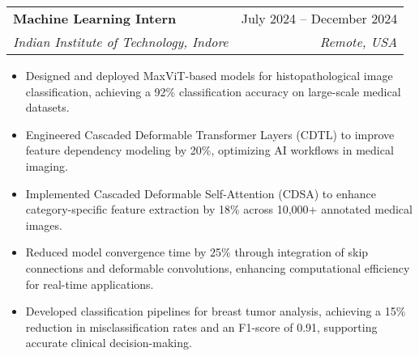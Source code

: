 \documentclass[letterpaper,10pt]{article}
\makeatletter
\newcommand{\resumeItem}[1]{
  \item\small{
    {#1 \vspace{-2pt}}
  }
}
\newcommand{\resumeSubheading}[4]{
  \vspace{-2pt}\item
    \begin{tabular*}{0.97\textwidth}[t]{l@{\extracolsep{\fill}}r}
      \textbf{#1} & #2 \\
      \textit{\small#3} & \textit{\small #4} \\
    \end{tabular*}\vspace{-7pt}
}
\newcommand{\resumeItemListStart}{\begin{itemize}}
\newcommand{\resumeItemListEnd}{\end{itemize}\vspace{-5pt}}
\makeatother
\begin{document}
\resumeSubheading
  {Machine Learning Intern \href{https://github.com/Akash-Kadali/A-Graph-Based-Framework-for-User-Level-Feature-Modeling-with-Contextual-Embeddings}{\faGithub}}{July 2024 -- December 2024}
  {Indian Institute of Technology, Indore}{Remote, USA}


      \resumeItemListStart
        \resumeItem{Designed and deployed MaxViT-based models for histopathological image classification, achieving a 92\% classification accuracy on large-scale medical datasets.}
        \resumeItem{Engineered Cascaded Deformable Transformer Layers (CDTL) to improve feature dependency modeling by 20\%, optimizing AI workflows in medical imaging.}
        \resumeItem{Implemented Cascaded Deformable Self-Attention (CDSA) to enhance category-specific feature extraction by 18\% across 10,000+ annotated medical images.}
        \resumeItem{Reduced model convergence time by 25\% through integration of skip connections and deformable convolutions, enhancing computational efficiency for real-time applications.}
        \resumeItem{Developed classification pipelines for breast tumor analysis, achieving a 15\% reduction in misclassification rates and an F1-score of 0.91, supporting accurate clinical decision-making.}
    \resumeItemListEnd
\end{document}
